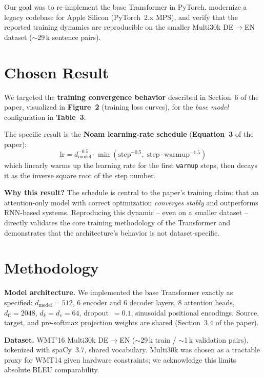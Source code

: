 \documentclass[10pt,twocolumn]{article}
\begin{document}
Our goal was to re-implement the base Transformer in PyTorch, modernize a
legacy codebase for Apple Silicon (PyTorch~2.x MPS), and verify that the
reported training dynamics are reproducible on the smaller Multi30k
DE$\rightarrow$EN dataset ($\sim$29\,k sentence pairs).

\section{Chosen Result}

We targeted the \textbf{training convergence behavior} described in Section~6
of the paper, visualized in \textbf{Figure~2} (training loss curves), for the
\emph{base model} configuration in \textbf{Table~3}.

The specific result is the \textbf{Noam learning-rate schedule}
(\textbf{Equation~3} of the paper):
\[
  \mathrm{lr} = d_{\mathrm{model}}^{-0.5}\!\cdot\!
    \min\!\left(\mathrm{step}^{-0.5},\;
    \mathrm{step}\cdot\mathrm{warmup}^{-1.5}\right)
\]
which linearly warms up the learning rate for the first \texttt{warmup} steps,
then decays it as the inverse square root of the step number.

\textbf{Why this result?}
The schedule is central to the paper's training claim: that an
attention-only model with correct optimization \emph{converges stably}
and outperforms RNN-based systems. Reproducing this dynamic -- even on a
smaller dataset -- directly validates the core training methodology of the
Transformer and demonstrates that the architecture's behavior is not
dataset-specific.

\section{Methodology}

\textbf{Model architecture.}
We implemented the base Transformer exactly as specified: $d_{\mathrm{model}}
{=}512$, 6 encoder and 6 decoder layers, 8 attention heads,
$d_{\mathrm{ff}}{=}2048$, $d_k{=}d_v{=}64$, dropout~$=0.1$, sinusoidal
positional encodings. Source, target, and pre-softmax projection weights are
shared (Section~3.4 of the paper).

\textbf{Dataset.}
WMT'16 Multi30k DE$\rightarrow$EN ($\sim$29\,k train / $\sim$1\,k validation
pairs), tokenized with spaCy~3.7, shared vocabulary. Multi30k was chosen as
a tractable proxy for WMT14 given hardware constraints; we acknowledge this
limits absolute BLEU comparability.
\end{document}

